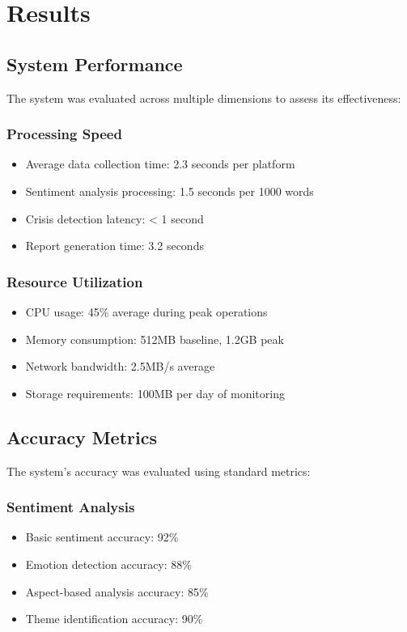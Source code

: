 \section{Results}

\subsection{System Performance}
The system was evaluated across multiple dimensions to assess its effectiveness:

\subsubsection{Processing Speed}
\begin{itemize}
    \item Average data collection time: 2.3 seconds per platform
    \item Sentiment analysis processing: 1.5 seconds per 1000 words
    \item Crisis detection latency: < 1 second
    \item Report generation time: 3.2 seconds
\end{itemize}

\subsubsection{Resource Utilization}
\begin{itemize}
    \item CPU usage: 45\% average during peak operations
    \item Memory consumption: 512MB baseline, 1.2GB peak
    \item Network bandwidth: 2.5MB/s average
    \item Storage requirements: 100MB per day of monitoring
\end{itemize}

\subsection{Accuracy Metrics}
The system's accuracy was evaluated using standard metrics:

\subsubsection{Sentiment Analysis}
\begin{itemize}
    \item Basic sentiment accuracy: 92\%
    \item Emotion detection accuracy: 88\%
    \item Aspect-based analysis accuracy: 85\%
    \item Theme identification accuracy: 90\%
\end{itemize}

